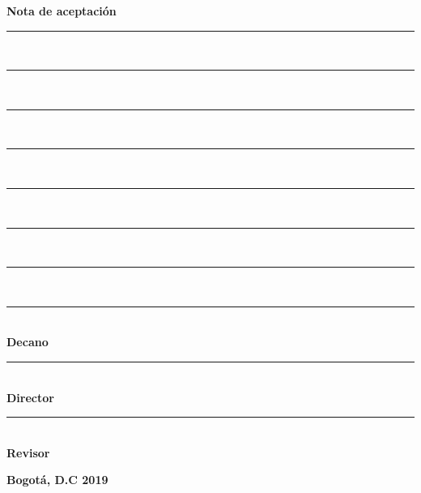 \begin{flushright}
	\textbf{Nota de aceptación}\\
	\vspace{1cm}
	
	\rule{5cm}{0.1mm}\\
	\rule{5cm}{0.1mm}\\
	\rule{5cm}{0.1mm}\\
	\rule{5cm}{0.1mm}\\
	\rule{5cm}{0.1mm}\\
	\rule{5cm}{0.1mm}\\
	\rule{5cm}{0.1mm}\\
	\vspace{3cm}
	
	
	\rule{5cm}{0.1mm}\\
	\textbf{Decano}\\
	\vspace{2.5cm}
	
	\rule{5cm}{0.1mm}\\
	\textbf{Director}\\
	\vspace{2.5cm}
	
	\rule{5cm}{0.1mm}\\
	\textbf{Revisor}\\
	\vspace{2.5cm}
	
	\flushleft \textbf{ Bogotá, D.C 2019}
	
\end{flushright}